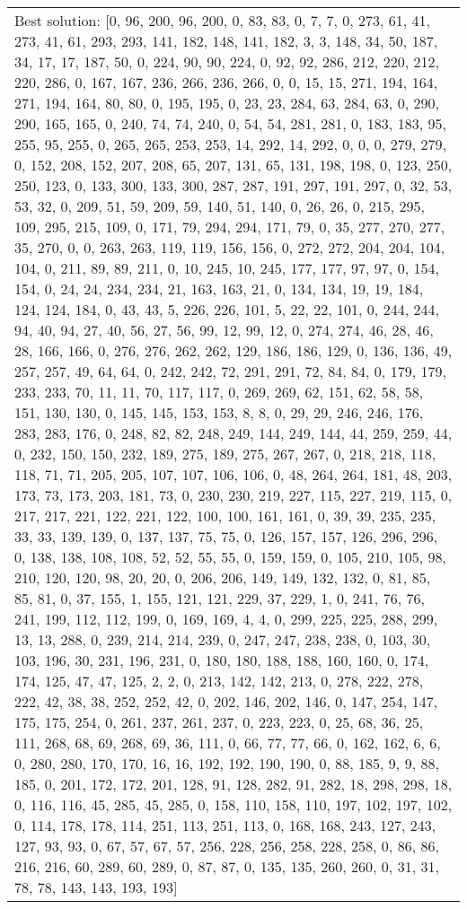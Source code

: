 \documentclass[]{article}
\begin{document}
\begin{table}[!ht]
\begin{tabular}{|m{3.2cm}|>{\centering\arraybackslash}m{2.8cm}|>{\centering\arraybackslash}m{2.8cm}|>{\centering\arraybackslash}m{2.8cm}|>{\centering\arraybackslash}m{2.8cm}|}
		\multicolumn{5}{|m{14cm}|}{Best solution: [0, 96, 200, 96, 200, 0, 83, 83, 0, 7, 7, 0, 273, 61, 41, 273, 41, 61, 293, 293, 141, 182, 148, 141, 182, 3, 3, 148, 34, 50, 187, 34, 17, 17, 187, 50, 0, 224, 90, 90, 224, 0, 92, 92, 286, 212, 220, 212, 220, 286, 0, 167, 167, 236, 266, 236, 266, 0, 0, 15, 15, 271, 194, 164, 271, 194, 164, 80, 80, 0, 195, 195, 0, 23, 23, 284, 63, 284, 63, 0, 290, 290, 165, 165, 0, 240, 74, 74, 240, 0, 54, 54, 281, 281, 0, 183, 183, 95, 255, 95, 255, 0, 265, 265, 253, 253, 14, 292, 14, 292, 0, 0, 0, 279, 279, 0, 152, 208, 152, 207, 208, 65, 207, 131, 65, 131, 198, 198, 0, 123, 250, 250, 123, 0, 133, 300, 133, 300, 287, 287, 191, 297, 191, 297, 0, 32, 53, 53, 32, 0, 209, 51, 59, 209, 59, 140, 51, 140, 0, 26, 26, 0, 215, 295, 109, 295, 215, 109, 0, 171, 79, 294, 294, 171, 79, 0, 35, 277, 270, 277, 35, 270, 0, 0, 263, 263, 119, 119, 156, 156, 0, 272, 272, 204, 204, 104, 104, 0, 211, 89, 89, 211, 0, 10, 245, 10, 245, 177, 177, 97, 97, 0, 154, 154, 0, 24, 24, 234, 234, 21, 163, 163, 21, 0, 134, 134, 19, 19, 184, 124, 124, 184, 0, 43, 43, 5, 226, 226, 101, 5, 22, 22, 101, 0, 244, 244, 94, 40, 94, 27, 40, 56, 27, 56, 99, 12, 99, 12, 0, 274, 274, 46, 28, 46, 28, 166, 166, 0, 276, 276, 262, 262, 129, 186, 186, 129, 0, 136, 136, 49, 257, 257, 49, 64, 64, 0, 242, 242, 72, 291, 291, 72, 84, 84, 0, 179, 179, 233, 233, 70, 11, 11, 70, 117, 117, 0, 269, 269, 62, 151, 62, 58, 58, 151, 130, 130, 0, 145, 145, 153, 153, 8, 8, 0, 29, 29, 246, 246, 176, 283, 283, 176, 0, 248, 82, 82, 248, 249, 144, 249, 144, 44, 259, 259, 44, 0, 232, 150, 150, 232, 189, 275, 189, 275, 267, 267, 0, 218, 218, 118, 118, 71, 71, 205, 205, 107, 107, 106, 106, 0, 48, 264, 264, 181, 48, 203, 173, 73, 173, 203, 181, 73, 0, 230, 230, 219, 227, 115, 227, 219, 115, 0, 217, 217, 221, 122, 221, 122, 100, 100, 161, 161, 0, 39, 39, 235, 235, 33, 33, 139, 139, 0, 137, 137, 75, 75, 0, 126, 157, 157, 126, 296, 296, 0, 138, 138, 108, 108, 52, 52, 55, 55, 0, 159, 159, 0, 105, 210, 105, 98, 210, 120, 120, 98, 20, 20, 0, 206, 206, 149, 149, 132, 132, 0, 81, 85, 85, 81, 0, 37, 155, 1, 155, 121, 121, 229, 37, 229, 1, 0, 241, 76, 76, 241, 199, 112, 112, 199, 0, 169, 169, 4, 4, 0, 299, 225, 225, 288, 299, 13, 13, 288, 0, 239, 214, 214, 239, 0, 247, 247, 238, 238, 0, 103, 30, 103, 196, 30, 231, 196, 231, 0, 180, 180, 188, 188, 160, 160, 0, 174, 174, 125, 47, 47, 125, 2, 2, 0, 213, 142, 142, 213, 0, 278, 222, 278, 222, 42, 38, 38, 252, 252, 42, 0, 202, 146, 202, 146, 0, 147, 254, 147, 175, 175, 254, 0, 261, 237, 261, 237, 0, 223, 223, 0, 25, 68, 36, 25, 111, 268, 68, 69, 268, 69, 36, 111, 0, 66, 77, 77, 66, 0, 162, 162, 6, 6, 0, 280, 280, 170, 170, 16, 16, 192, 192, 190, 190, 0, 88, 185, 9, 9, 88, 185, 0, 201, 172, 172, 201, 128, 91, 128, 282, 91, 282, 18, 298, 298, 18, 0, 116, 116, 45, 285, 45, 285, 0, 158, 110, 158, 110, 197, 102, 197, 102, 0, 114, 178, 178, 114, 251, 113, 251, 113, 0, 168, 168, 243, 127, 243, 127, 93, 93, 0, 67, 57, 67, 57, 256, 228, 256, 258, 228, 258, 0, 86, 86, 216, 216, 60, 289, 60, 289, 0, 87, 87, 0, 135, 135, 260, 260, 0, 31, 31, 78, 78, 143, 143, 193, 193]}\\

\end{tabular}
\end{table}
\end{document}
